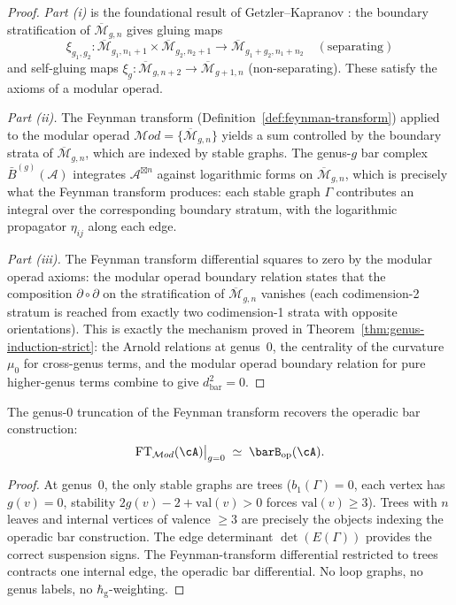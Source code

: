 \begin{proof}
\emph{Part (i)} is the foundational result of
Getzler--Kapranov \cite[§5]{GeK98}: the boundary stratification of
$\overline{\mathcal{M}}_{g,n}$ gives gluing maps
\[
\xi_{g_1,g_2}\colon \overline{\mathcal{M}}_{g_1,n_1+1} \times
\overline{\mathcal{M}}_{g_2,n_2+1} \to
\overline{\mathcal{M}}_{g_1+g_2,n_1+n_2}
\quad (\text{separating})
\]
and self-gluing maps
$\xi_g\colon \overline{\mathcal{M}}_{g,n+2} \to
\overline{\mathcal{M}}_{g+1,n}$
(non-separating). These satisfy the axioms of a modular operad.

\emph{Part (ii).}
The Feynman transform (Definition~\ref{def:feynman-transform})
applied to the modular operad
$\mathcal{M}od = \{\overline{\mathcal{M}}_{g,n}\}$ yields a sum
controlled by the
boundary strata of $\overline{\mathcal{M}}_{g,n}$, which are
indexed by stable graphs. The genus-$g$ bar complex
$\bar{B}^{(g)}(\mathcal{A})$ integrates
$\mathcal{A}^{\boxtimes n}$ against logarithmic forms on
$\overline{\mathcal{M}}_{g,n}$, which is precisely what
the Feynman transform produces: each stable graph $\Gamma$
contributes an integral over the corresponding boundary stratum,
with the logarithmic propagator $\eta_{ij}$ along each edge.

\emph{Part (iii).}
The Feynman transform differential squares to zero by the
modular operad axioms: the modular operad boundary relation states
that the composition $\partial \circ \partial$ on the
stratification of $\overline{\mathcal{M}}_{g,n}$ vanishes (each
codimension-2 stratum is reached from exactly two codimension-1
strata with opposite orientations). This is exactly the mechanism
proved in Theorem~\ref{thm:genus-induction-strict}: the Arnold
relations at genus~$0$, the centrality of the curvature $\mu_0$
for cross-genus terms, and the modular operad boundary relation
for pure higher-genus terms combine to give
$d_{\mathrm{bar}}^2 = 0$.
\end{proof}

\begin{corollary}
\label{cor:feynman-genus0-reduction}
The genus-$0$ truncation of the Feynman transform recovers the
operadic bar construction:
\[
\mathrm{FT}_{\mathcal{M}od}(\cA)\big|_{g=0}
\;\simeq\;
\barB_{\mathrm{op}}(\cA).
\]
\end{corollary}

\begin{proof}
At genus~$0$, the only stable graphs are trees
($b_1(\Gamma) = 0$, each vertex has $g(v) = 0$, stability
$2g(v) - 2 + \mathrm{val}(v) > 0$ forces $\mathrm{val}(v) \ge 3$).
Trees with $n$ leaves and internal vertices of valence $\ge 3$ are
precisely the objects indexing the operadic bar construction. The
edge determinant $\det(E(\Gamma))$ provides the correct suspension
signs. The Feynman-transform differential restricted to trees
contracts one internal edge, the operadic bar differential. No
loop graphs, no genus labels, no $\hbar_{\mathrm{g}}$-weighting.
\end{proof}

